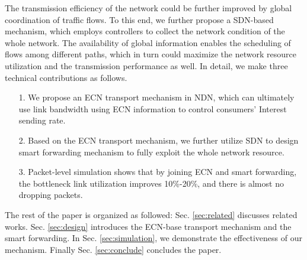 The transmission efficiency of the network could be further improved by global coordination of traffic flows. To this end, we further propose a SDN-based mechanism, which employs controllers to collect the network condition of the whole network. The availability of global information enables the scheduling of flows among different paths, which in turn could maximize the network resource utilization and the transmission performance as well. In detail, we make three technical contributions as follows.

\begin{enumerate}
	\item[1.] We propose an ECN transport mechanism in NDN, which can ultimately use link bandwidth using ECN information to control consumers' Interest sending rate.
	\item[2.] Based on the ECN transport mechanism, we further utilize SDN to design smart forwarding mechanism to fully exploit the whole network resource.
	\item[3.] Packet-level simulation shows that by joining ECN and smart forwarding, the bottleneck link utilization improves 10\%-20\%, and there is almost no dropping packets.
\end{enumerate}


The rest of the paper is organized as followed: Sec. \ref{sec:related} discusses related works. Sec. \ref{sec:design} introduces the ECN-base transport mechanism and the smart forwarding. In Sec. \ref{sec:simulation}, we demonstrate the effectiveness of our mechanism. Finally Sec. \ref{sec:conclude} concludes the paper.
